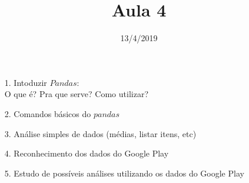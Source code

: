 \documentclass[12pt]{article}
\title{Aula 4}
\date{13/4/2019}
\begin{document}
	\maketitle
	\begin{itemize}
		\item[1.]
			Intoduzir $Pandas$:\\
			\subitem
				O que é?
			\subitem
				Pra que serve?
			\subitem
				Como utilizar?		 
		\item[2.]
			Comandos básicos do $pandas$
		\item[3.]
			Análise simples de dados (médias, listar itens, etc)
		\item[4.]
			Reconhecimento dos dados do Google Play
		\item[5.]
			Estudo de possíveis análises utilizando os dados do
			Google Play
	\end{itemize}
\end{document}
